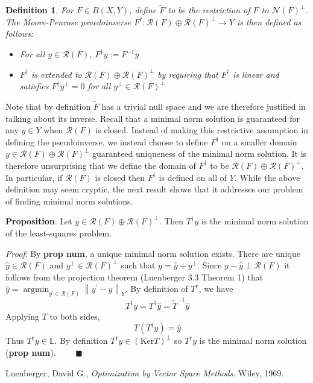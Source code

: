 \documentclass[12pt]{article}
\newcommand*{\norm}[1]{\left\lVert#1\right\rVert}
\newcommand{\R}{\mathcal{R}}
\newcommand{\N}{\mathcal{N}}
\newcommand{\Ker}{\mathrm{Ker}}
\DeclareMathOperator*{\argmin}{argmin}
\newtheorem{definition}{Definition}
\begin{document}
 \begin{definition} 
 For $F \in B(X, Y)$, define $\tilde{F}$ to be the restriction of $F$ to $\N(F)^\perp$. The Moore-Penrose psuedoinverse $F^\dagger : \R(F) \oplus \R(F)^\perp \to Y$ is then defined as follows: 
 \begin{itemize} 
 \item For all $y \in \R(F)$, $F^\dagger y := F^{-1}y$
 \item $F^\dagger$ is extended to $\R(F) \oplus \R(F)^\perp$ by requiring that $F^\dagger$ is linear and satisfies $F^\dagger y^\perp = 0$ for all $y^\perp \in \R(F)^\perp$
 \end{itemize} 
 \end{definition} 
 
Note that by definition $\tilde{F}$ has a trivial null space and we are therefore justified in talking 
about its inverse. Recall that a minimal norm solution is guaranteed for any $y \in Y$ when $\R(F)$ is closed. 
Instead of making this restrictive assumption in defining the pseudoinverse, we instead choose to define 
 $F^\dagger$ on a smaller domain $y \in \R(F) \oplus \R(F)^\perp$ 
guaranteed uniqueness of the minimal norm solution. It is therefore unsurprising that we define the 
domain of $F^\dagger$ to be $\R(F) \oplus \R(F)^\perp$. In particular, if $\R(F)$ is closed then $F^\dagger$ 
is defined on all of $Y$. While the above definition may seem cryptic, the next result shows that it addresses
 our problem of finding minimal norm solutions.

\textbf{Proposition}: Let $y \in \R(F) \oplus \R(F)^\perp$. Then $T^\dagger y$ is the minimal norm solution of the least-squares problem. 

\smallskip 

\textit{Proof}: By \textbf{prop num}, a unique minimal norm solution exists. There are unique $\hat{y} \in \R(F)$ and $y^\perp \in \R(F)^\perp$ such that $y = \hat{y} + y^\perp$. Since $y - \hat{y} \perp \R(F)$ it follows from the projection theorem (Luenberger 3.3 Theorem 1) that $\hat{y} = \argmin_{y^\prime \in \R(F)} \norm{y^\prime - y}_Y$. By definition of $T^\dagger$, we have \[T^\dagger y = T^\dagger \hat{y} = \tilde{T}^{-1}\hat{y}\]
 Applying $T$ to both sides, \[T(T^\dagger y) = \hat{y}\]
 Thus $T^\dagger y \in \mathbb{L}$. By definition $T^\dagger y \in (\Ker T)^\perp$ so $T^\dagger y$ is the minimal norm solution (\textbf{prop num}). $\qquad \blacksquare$
 
 
\begin{thebibliography}{20}

  Luenberger, David G., \textit{Optimization by Vector Space Methods}. Wiley, 1969. 

\end{thebibliography}
 
\end{document}

